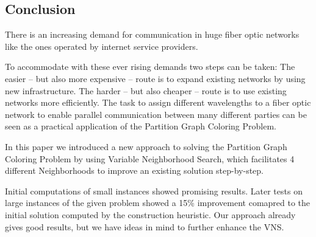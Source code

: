 \documentclass[paper=a4,fontsize=12pt]{scrartcl}
\begin{document}

\subsection{Conclusion}
There is an increasing demand for communication in huge fiber optic networks like the ones operated by internet service providers.


To accommodate with these ever rising demands two steps can be taken: The easier -- but also more expensive -- route is to expand existing networks by using new infrastructure. The harder -- but also cheaper -- route is to use existing networks more efficiently. The task to assign different wavelengths to a fiber optic network to enable parallel communication between many different parties can be seen as a practical application of the Partition Graph Coloring Problem. 


In this paper we introduced a new approach to solving the Partition Graph Coloring Problem by using Variable Neighborhood Search, which facilitates 4 different Neighborhoods to improve an existing solution step-by-step.


Initial computations of small instances showed promising results. Later tests on large instances of the given problem showed a 15\% improvement comapred to the initial solution computed by the construction heuristic. Our approach already gives good results, but we have ideas in mind to further enhance the VNS.
\end{document}
